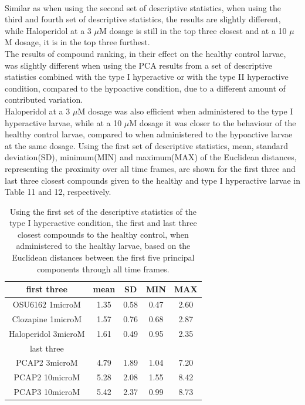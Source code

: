 \documentclass[a4paper,12pt]{article}
\begin{document}
\\
Similar as when using the second set of descriptive statistics, when using the third and fourth set of descriptive statistics, the results are slightly different, while Haloperidol at a 3 $\mu$M dosage is still in the top three closest and at a 10 $\mu$M dosage, it is in the top three furthest.
\\
The results of compound ranking, in their effect on the healthy control larvae, was slightly different when using the PCA results from a set of descriptive statistics combined with the type I hyperactive or with the type II hyperactive condition, compared to the hypoactive condition, due to a different amount of contributed variation.
\\Haloperidol at a 3 $\mu$M dosage was also efficient when administered to the type I hyperactive larvae, while at a 10 $\mu$M dosage it was closer to the behaviour of the healthy control larvae, compared to when administered to the hypoactive larvae at the same dosage. Using the first set of descriptive statistics, mean, standard deviation(SD), minimum(MIN) and maximum(MAX) of the Euclidean distances, representing the proximity over all time frames, are shown for the first three and last three closest compounds given to the healthy and type I hyperactive larvae in Table 11 and 12, respectively.
\begin{table}[h!]\tiny
\centering
\begin{tabular}{|c|c|c|c|c|}
\hline
first three         & mean & SD   & MIN  & MAX  \\ \hline
OSU6162 1microM     & 1.35 & 0.58 & 0.47 & 2.60  \\ \hline
Clozapine 1microM   & 1.57 & 0.76 & 0.68 & 2.87 \\ \hline
Haloperidol 3microM & 1.61 & 0.49 & 0.95 & 2.35 \\ \hline
last three          & \multicolumn{4}{c|}{}     \\ \hline
PCAP2 3microM       & 4.79 & 1.89 & 1.04 & 7.20  \\ \hline
PCAP2 10microM      & 5.28 & 2.08 & 1.55 & 8.42 \\ \hline
PCAP3 10microM    & 5.42 & 2.37 & 0.99 & 8.73 \\ \hline
\end{tabular}
\caption{Using the first set of the descriptive statistics of the type I hyperactive condition, the first and last three closest compounds to the healthy control, when administered to the healthy larvae, based on the Euclidean distances between the first five principal components through all time frames.}
\end{table}
\end{document}

